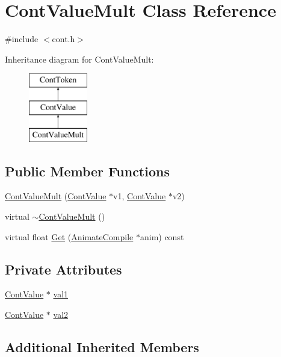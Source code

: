 \hypertarget{a00091}{\section{Cont\-Value\-Mult Class Reference}
\label{a00091}
}


{\ttfamily \#include $<$cont.\-h$>$}

Inheritance diagram for Cont\-Value\-Mult\-:\begin{figure}[H]
\begin{center}
\leavevmode
\includegraphics[height=3.000000cm]{a00091}
\end{center}
\end{figure}
\subsection*{Public Member Functions}
\begin{DoxyCompactItemize}
\item 
\hyperlink{a00091_a8412b781a54e3b33ba6956b0058099d3}{Cont\-Value\-Mult} (\hyperlink{a00086}{Cont\-Value} $\ast$v1, \hyperlink{a00086}{Cont\-Value} $\ast$v2)
\item 
virtual \hyperlink{a00091_a973dd7137907888b04443170c0dd45eb}{$\sim$\-Cont\-Value\-Mult} ()
\item 
virtual float \hyperlink{a00091_a3aa661c3914c4d8d2e4b931a66ff1c3c}{Get} (\hyperlink{a00007}{Animate\-Compile} $\ast$anim) const 
\end{DoxyCompactItemize}
\subsection*{Private Attributes}
\begin{DoxyCompactItemize}
\item 
\hyperlink{a00086}{Cont\-Value} $\ast$ \hyperlink{a00091_abdc19d5e3b2793c11011a2ccba833075}{val1}
\item 
\hyperlink{a00086}{Cont\-Value} $\ast$ \hyperlink{a00091_a6515c303d54374dfc9454604cc6c07d1}{val2}
\end{DoxyCompactItemize}
\subsection*{Additional Inherited Members}


